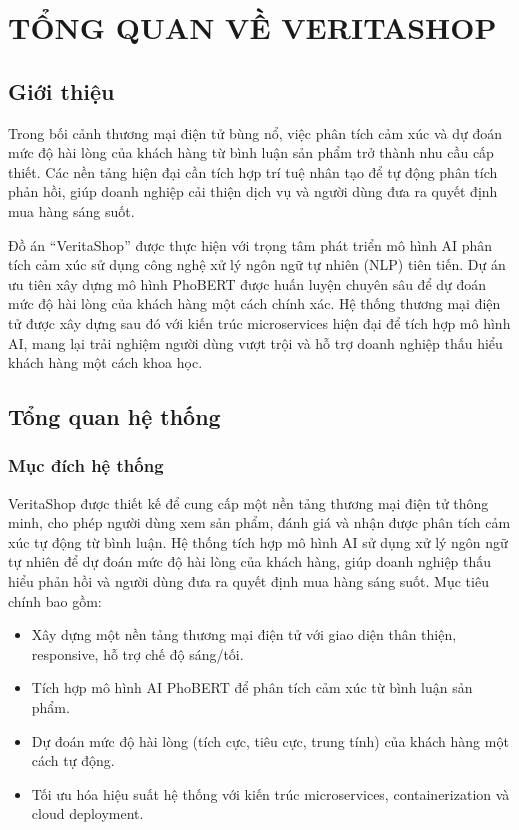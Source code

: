 
\newpage

\section{\textbf{TỔNG QUAN VỀ VERITASHOP}}

\subsection{Giới thiệu}
Trong bối cảnh thương mại điện tử bùng nổ, việc phân tích cảm xúc và dự đoán mức độ hài lòng của khách hàng từ bình luận sản phẩm trở thành nhu cầu cấp thiết. Các nền tảng hiện đại cần tích hợp trí tuệ nhân tạo để tự động phân tích phản hồi, giúp doanh nghiệp cải thiện dịch vụ và người dùng đưa ra quyết định mua hàng sáng suốt.

Đồ án ``VeritaShop'' được thực hiện với trọng tâm phát triển mô hình AI phân tích cảm xúc sử dụng công nghệ xử lý ngôn ngữ tự nhiên (NLP) tiên tiến. Dự án ưu tiên xây dựng mô hình PhoBERT được huấn luyện chuyên sâu để dự đoán mức độ hài lòng của khách hàng một cách chính xác. Hệ thống thương mại điện tử được xây dựng sau đó với kiến trúc microservices hiện đại để tích hợp mô hình AI, mang lại trải nghiệm người dùng vượt trội và hỗ trợ doanh nghiệp thấu hiểu khách hàng một cách khoa học.

\subsection{Tổng quan hệ thống}
\subsubsection{Mục đích hệ thống}
VeritaShop được thiết kế để cung cấp một nền tảng thương mại điện tử thông minh, cho phép người dùng xem sản phẩm, đánh giá và nhận được phân tích cảm xúc tự động từ bình luận. Hệ thống tích hợp mô hình AI sử dụng xử lý ngôn ngữ tự nhiên để dự đoán mức độ hài lòng của khách hàng, giúp doanh nghiệp thấu hiểu phản hồi và người dùng đưa ra quyết định mua hàng sáng suốt. Mục tiêu chính bao gồm:
\begin{itemize}
    \item Xây dựng một nền tảng thương mại điện tử với giao diện thân thiện, responsive, hỗ trợ chế độ sáng/tối.
    \item Tích hợp mô hình AI PhoBERT để phân tích cảm xúc từ bình luận sản phẩm.
    \item Dự đoán mức độ hài lòng (tích cực, tiêu cực, trung tính) của khách hàng một cách tự động.
    \item Tối ưu hóa hiệu suất hệ thống với kiến trúc microservices, containerization và cloud deployment.
\end{itemize}


